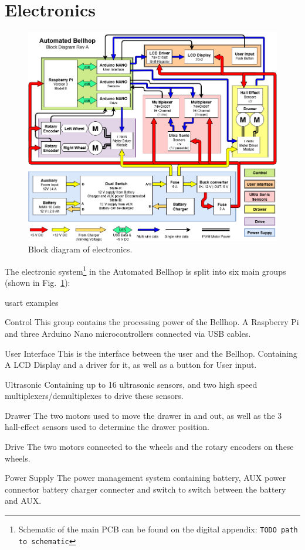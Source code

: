 \documentclass[11pt]{article}
\begin{document}
\newpage
\section{Electronics}
\begin{figure}[h]
  \centering
  \includegraphics[width=14cm]{block.png}
  \caption{Block diagram of electronics.}
  \label{blockdiagram}
\end{figure}

The electronic system\footnote{Schematic of the main PCB can be found on the digital appendix: \texttt{TODO path to schematic}} in the Automated Bellhop is split into six main groups (shown in Fig.~\ref{blockdiagram}):
\begin{labeling}{usart examples}
\item [Control] This group contains the processing power of the Bellhop. A Raspberry Pi  and three Arduino Nano microcontrollers connected via USB cables.
\item [User Interface] This is the interface between the user and the Bellhop. Containing A LCD Display and a driver for it, as well as a button for User input.
\item [Ultrasonic] Containing up to 16 ultrasonic sensors, and two high speed multiplexers/demultiplexes to drive these sensors.
\item [Drawer] The two motors used to move the drawer in and out, as well as the 3 hall-effect sensors used to determine the drawer position.
\item [Drive] The two motors connected to the wheels and the rotary encoders on these wheels.
\item [Power Supply] The power management system containing battery, AUX power connector battery charger connecter and switch to switch between the battery and AUX.
\end{labeling}
\end{document}
